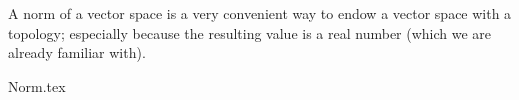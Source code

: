\label{chap:nspace}

A norm of a vector space is a very convenient way
to endow a vector space with a topology;
especially because the resulting value is a real number
(which we are already familiar with).

{Norm.tex}